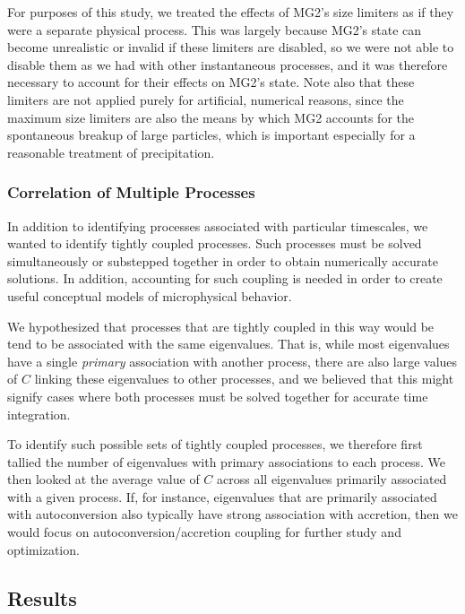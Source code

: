 \documentclass [11pt, proquest] {uwthesis}[2020/02/24]
\begin{document}
For purposes of this study, we treated the effects of MG2's size limiters as if they were a separate physical process. This was largely because MG2's state can become unrealistic or invalid if these limiters are disabled, so we were not able to disable them as we had with other instantaneous processes, and it was therefore necessary to account for their effects on MG2's state. Note also that these limiters are not applied purely for artificial, numerical reasons, since the maximum size limiters are also the means by which MG2 accounts for the spontaneous breakup of large particles, which is important especially for a reasonable treatment of precipitation.

\subsubsection{Correlation of Multiple Processes}

In addition to identifying processes associated with particular timescales, we wanted to identify tightly coupled processes. Such processes must be solved simultaneously or substepped together in order to obtain numerically accurate solutions. In addition, accounting for such coupling is needed in order to create useful conceptual models of microphysical behavior.

We hypothesized that processes that are tightly coupled in this way would be tend to be associated with the same eigenvalues. That is, while most eigenvalues have a single \emph{primary} association with another process, there are also large values of $C$ linking these eigenvalues to other processes, and we believed that this might signify cases where both processes must be solved together for accurate time integration.

To identify such possible sets of tightly coupled processes, we therefore first tallied the number of eigenvalues with primary associations to each process. We then looked at the average value of $C$ across all eigenvalues primarily associated with a given process. If, for instance, eigenvalues that are primarily associated with autoconversion also typically have strong association with accretion, then we would focus on autoconversion/accretion coupling for further study and optimization.

\subsection{Results}
\label{sec:proc-assoc-results}
\end{document}

